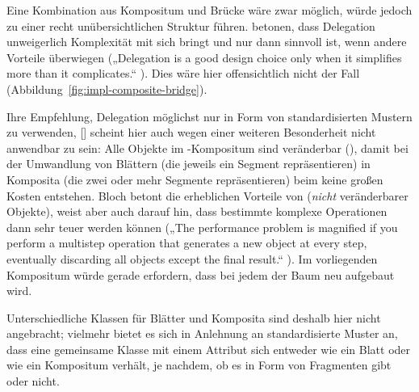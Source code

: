 \documentclass[../main/thesis.tex]{subfiles}
\begin{document}
Eine Kombination aus Kompositum und Brücke wäre zwar möglich, würde jedoch zu einer recht unübersichtlichen Struktur führen.
 betonen, dass Delegation unweigerlich Komplexität mit sich bringt und nur dann sinnvoll ist, wenn andere Vorteile überwiegen („Delegation is a good design choice only when it simplifies more than it complicates.“ ).
Dies wäre hier offensichtlich nicht der Fall (Abbildung~\ref{fig:impl-composite-bridge}).

Ihre Empfehlung, Delegation möglichst nur in Form von standardisierten Mustern zu verwenden, [\cfibid] scheint hier auch wegen einer weiteren Besonderheit nicht anwendbar zu sein:
Alle Objekte im -Kompositum sind veränderbar (), damit bei der Umwandlung von Blättern (die jeweils ein Segment repräsentieren) in Komposita (die zwei oder mehr Segmente repräsentieren) beim  keine großen Kosten entstehen.
Bloch betont die erheblichen Vorteile von  (\emph{nicht} veränderbarer Objekte), weist aber auch darauf hin, dass bestimmte komplexe Operationen dann sehr teuer werden können („The performance problem is magnified if you perform a multistep operation that generates a new object at every step, eventually discarding all objects except the final result.“ ).
Im vorliegenden Kompositum würde  gerade erfordern, dass bei jedem  der Baum neu aufgebaut wird.

Unterschiedliche Klassen für Blätter und Komposita sind deshalb hier nicht angebracht; vielmehr bietet es sich in Anlehnung an standardisierte Muster an, dass eine gemeinsame Klasse mit einem Attribut  sich entweder wie ein Blatt oder wie ein Kompositum verhält, je nachdem, ob es  in Form von Fragmenten gibt oder nicht.

\end{document}
